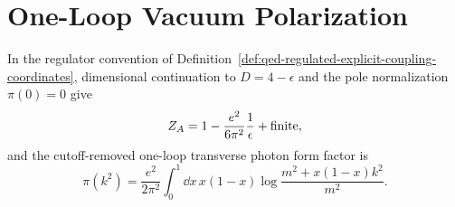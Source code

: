 \section{One-Loop Vacuum Polarization}

\begin{lemma}
\label{lem:qed-one-loop-vacuum-polarization}
In the regulator convention of
Definition~\ref{def:qed-regulated-explicit-coupling-coordinates}, dimensional
continuation to \(D=4-\epsilon\) and the pole normalization \(\pi(0)=0\) give
\[
  Z_A=1-\frac{e^2}{6\pi^2}\frac1\epsilon+\textup{finite},
\]
and the cutoff-removed one-loop transverse photon form factor is
\[
  \pi(k^2)
  =
  \frac{e^2}{2\pi^2}
  \int_0^1\dd x\,x(1-x)
  \log
  \frac{m^2+x(1-x)k^2}{m^2}.
\]
\end{lemma}

